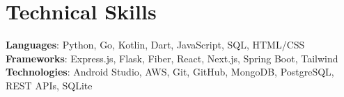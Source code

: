 \section{Technical Skills}
    \vspace{3pt}
    \begin{itemize}[leftmargin=0.15in, label={}]
	\small{\item{
		\textbf{Languages}{: 
  Python,
  Go,
  Kotlin,
  Dart,
  JavaScript,
  SQL,
  HTML/CSS
  }  \\ \vspace{2.5pt}
		\textbf{Frameworks}{: 
  Express.js,
  Flask,
  Fiber,
  React,
  Next.js,
  Spring Boot,
  Tailwind
  }  \\ \vspace{2.5pt}
		\textbf{Technologies}{: 
  Android Studio,
  AWS,
  Git,
  GitHub,
  MongoDB,
  PostgreSQL,
  REST APIs,
  SQLite
  }  \\ \vspace{2.5pt}
	}}
    \end{itemize}